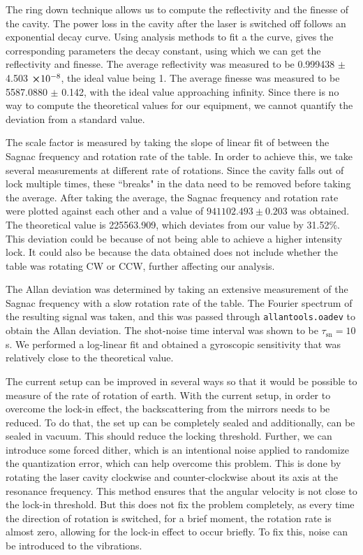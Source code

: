 \documentclass[a4paper]{report}
\numberwithin{equation}{section}
\begin{document}
The ring down technique allows us to compute the reflectivity and the finesse of the cavity. The power loss in the cavity after the laser is switched off follows an exponential decay curve. Using analysis methods to fit a the curve, gives the corresponding parameters the decay constant, using which we can get the reflectivity and finesse. The average reflectivity was measured to be 0.999438 $\pm$ 4.503 $\cross 10^{-8}$, the ideal value being 1. The average finesse was measured to be 5587.0880 $\pm$ 0.142, with the ideal value approaching infinity. Since there is no way to compute the theoretical values for our equipment, we cannot quantify the deviation from a standard value. 

The scale factor is measured by taking the slope of linear fit of between the Sagnac frequency and rotation rate of the table. In order to achieve this, we take several measurements at different rate of rotations. Since the cavity falls out of lock multiple times, these ``breaks" in the data need to be removed before taking the average. After taking the average, the Sagnac frequency and rotation rate were plotted against each other and a value of $941102.493 \pm 0.203$ was obtained. The theoretical value is 225563.909, which deviates from our value by 31.52\%. This deviation could be because of not being able to achieve a higher intensity lock. It could also be because the data obtained does not include whether the table was rotating CW or CCW, further affecting our analysis.

The Allan deviation was determined by taking an extensive measurement of the Sagnac frequency with a slow rotation rate of the table. The Fourier spectrum of the resulting signal was taken, and this was passed through \texttt{allantools.oadev} to obtain the Allan deviation. The shot-noise time interval was shown to be $\tau_{\mathrm{sn}} = 10$s. We performed a log-linear fit and obtained a gyroscopic sensitivity that was relatively close to the theoretical value.

The current setup can be improved in several ways so that it would be possible to measure of the rate of rotation of earth. With the current setup, in order to overcome the lock-in effect, the backscattering from the mirrors needs to be reduced. To do that, the set up can be completely sealed and additionally, can be sealed in vacuum. This should reduce the locking threshold. Further, we can introduce some forced dither, which is an intentional noise applied to randomize the quantization error, which can help overcome this problem. This is done by rotating the laser cavity clockwise and counter-clockwise about its axis at the resonance frequency. This method ensures that the angular velocity is not close to the lock-in threshold. But this does not fix the problem completely, as every time the direction of rotation is switched, for a brief moment, the rotation rate is almost zero, allowing for the lock-in effect to occur briefly. To fix this, noise can be introduced to the vibrations. 
\end{document}

